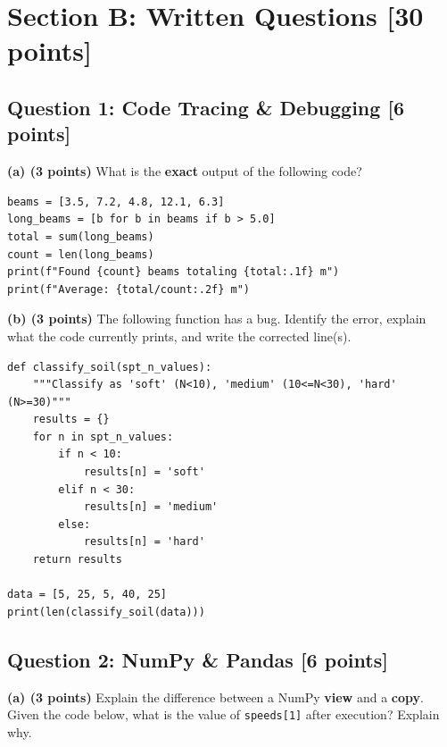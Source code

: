 \documentclass[11pt,a4paper]{article}
\begin{document}
\newpage
\section*{Section B: Written Questions \hfill [30 points]}

\subsection*{Question 1: Code Tracing \& Debugging \hfill [6 points]}

\noindent\textbf{(a) (3 points)} What is the \textbf{exact} output of the following code?

\begin{lstlisting}
beams = [3.5, 7.2, 4.8, 12.1, 6.3]
long_beams = [b for b in beams if b > 5.0]
total = sum(long_beams)
count = len(long_beams)
print(f"Found {count} beams totaling {total:.1f} m")
print(f"Average: {total/count:.2f} m")
\end{lstlisting}

\vspace{4.5cm}

\noindent\textbf{(b) (3 points)} The following function has a bug. Identify the error, explain what the code currently prints, and write the corrected line(s).

\begin{lstlisting}
def classify_soil(spt_n_values):
    """Classify as 'soft' (N<10), 'medium' (10<=N<30), 'hard' (N>=30)"""
    results = {}
    for n in spt_n_values:
        if n < 10:
            results[n] = 'soft'
        elif n < 30:
            results[n] = 'medium'
        else:
            results[n] = 'hard'
    return results

data = [5, 25, 5, 40, 25]
print(len(classify_soil(data)))
\end{lstlisting}

\vspace{5cm}

\subsection*{Question 2: NumPy \& Pandas \hfill [6 points]}

\noindent\textbf{(a) (3 points)} Explain the difference between a NumPy \textbf{view} and a \textbf{copy}. Given the code below, what is the value of \lstinline{speeds[1]} after execution? Explain why.
\end{document}
